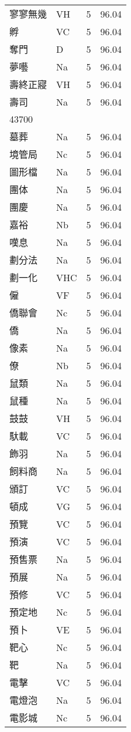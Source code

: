 \documentclass[twocolumn]{book}
\begin{document}
\begin{supertabular}{llrr}
寥寥無幾 & VH & 5 &  96.04\\
孵 & VC & 5 &  96.04\\
奪門 & D & 5 &  96.04\\
夢囈 & Na & 5 &  96.04\\
壽終正寢 & VH & 5 &  96.04\\
壽司 & Na & 5 &  96.04\\
43700\\
墓葬 & Na & 5 &  96.04\\
境管局 & Nc & 5 &  96.04\\
圖形檔 & Na & 5 &  96.04\\
團体 & Na & 5 &  96.04\\
團慶 & Na & 5 &  96.04\\
嘉裕 & Nb & 5 &  96.04\\
嘆息 & Na & 5 &  96.04\\
劃分法 & Na & 5 &  96.04\\
劃一化 & VHC & 5 &  96.04\\
僱 & VF & 5 &  96.04\\
僑聯會 & Nc & 5 &  96.04\\
僑 & Na & 5 &  96.04\\
像素 & Na & 5 &  96.04\\
僚 & Nb & 5 &  96.04\\
鼠類 & Na & 5 &  96.04\\
鼠種 & Na & 5 &  96.04\\
鼓鼓 & VH & 5 &  96.04\\
馱載 & VC & 5 &  96.04\\
飾羽 & Na & 5 &  96.04\\
飼料商 & Na & 5 &  96.04\\
頒訂 & VC & 5 &  96.04\\
頓成 & VG & 5 &  96.04\\
預覽 & VC & 5 &  96.04\\
預演 & VC & 5 &  96.04\\
預售票 & Na & 5 &  96.04\\
預展 & Na & 5 &  96.04\\
預修 & VC & 5 &  96.04\\
預定地 & Nc & 5 &  96.04\\
預卜 & VE & 5 &  96.04\\
靶心 & Nc & 5 &  96.04\\
靶 & Na & 5 &  96.04\\
電擊 & VC & 5 &  96.04\\
電燈泡 & Na & 5 &  96.04\\
電影城 & Nc & 5 &  96.04\\

\end{supertabular}
\end{document}
